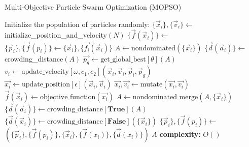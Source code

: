 \begin{algorithm}[H]
\caption{Multi-Objective Particle Swarm Optimization (MOPSO)}
\label{alg:mopso}
\begin{algorithmic}[1]
\State Initialize the population of particles randomly:
\State $\{\vec{x}_i\}, \{\vec{v}_i\} \gets$ initialize\_position\_and\_velocity$(N)$
\State $\{\vec{f}(\vec{x}_i)\} \gets$ 
\State $\{\vec{p}_i\}, \{\vec{f}(p_i)\}  \gets \{\vec{x}_i\}, \{\vec{f_{i}}(\vec{x}_i)\} $ 
\State $A \gets \text{nondominated}(\{\vec{x}_i\})$ 
\State $\{ \vec{d}(\vec{a}_i)\} \gets$ crowding\_distance$(A)$ 
\State $\vec{p_g} \gets \text{get\_global\_best}[\theta](A)$ 
\State $v_i \gets \text{update\_velocity}[\omega,c_1, c_2](\vec{x}_i,\vec{v}_i,\vec{p}_i,\vec{p}_g)$
\State $\vec{x_i} \gets \text{update\_position}[\epsilon](\vec{x}_i,\vec{v}_i)$
\State $\vec{x_i}, \vec{v_i} \gets \text{mutate}(\vec{x_i}, \vec{v_i})$ 
\EndIf
\State $\vec{f}(\vec{x}_i) \gets \text{objective\_function}(\vec{x_i})$ 
\EndFor 
\State $A \gets \text{nondominated\_merge}(A, \{\vec{x}_i\})$ 
\State $\{ \vec{d}(\vec{a}_i)\} \gets\text{crowding\_distance}[\textbf{True}](A)$
\State $\{ \vec{d}(\vec{x}_i)\} \gets\text{crowding\_distance}[\textbf{False}](\{\vec{x}_i\})$
\State $\{\vec{p}_i\}, \{\vec{f}(p_i)\} \gets$ $(\{\vec{p}_i\}, \{\vec{f}(p_i)\},\{\vec{x}_i\}, \{\vec{f}(x_i)\}, \{\vec{d}(x_i)\})$
\EndFor
\State \Return $A$
\State \textbf{complexity: } $O()$
\end{algorithmic}
\end{algorithm}

